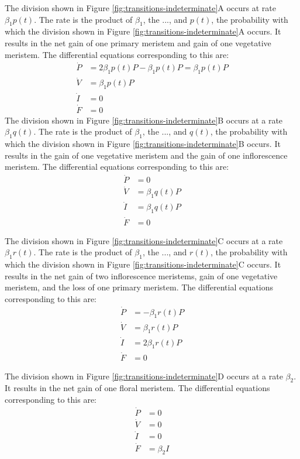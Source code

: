 \documentclass[12pt, oneside]{article}   	%
\begin{document}
The division shown in Figure \ref{fig:transitions-indeterminate}A occurs at rate $\beta_1 p(t)$. The rate is the product of $\beta_1$, the ..., and $p(t)$, the probability with which the division shown in Figure \ref{fig:transitions-indeterminate}A occurs. It results in the net gain of one primary meristem and gain of one vegetative meristem. The differential equations corresponding to this are:
%
\begin{align}
\dot{P} & = 2 \beta_1 p(t)  P - \beta_1 p(t) P = \beta_1 p(t) P \nonumber \\
\dot{V} & = \beta_1 p(t)  P      \nonumber \\
\dot{I} & = 0  \nonumber \\
\dot{F} & = 0
\end{align}
%
The division shown in Figure \ref{fig:transitions-indeterminate}B occurs at a rate $\beta_1 q(t)$. The rate is the product of $\beta_1$, the ..., and $q(t)$, the probability with which the division shown in Figure \ref{fig:transitions-indeterminate}B occurs. It results in the gain of one vegetative meristem and the gain of one inflorescence meristem. The differential equations corresponding to this are:
%
\begin{align}
\dot{P} & = 0 \nonumber \\
\dot{V} & = \beta_1 q(t) P      \nonumber \\
\dot{I} & =  \beta_1 q(t) P \nonumber \\
\dot{F} & = 0
\end{align}
%

The division shown in Figure \ref{fig:transitions-indeterminate}C occurs at a rate $\beta_1 r(t)$. The rate is the product of $\beta_1$, the ..., and $r(t)$, the probability with which the division shown in Figure \ref{fig:transitions-indeterminate}C occurs. It results in the net gain of two inflorescence meristems, gain of one vegetative meristem, and the loss of one primary meristem. The differential equations corresponding to this are:
%
\begin{align}
\dot{P} & = - \beta_1 r(t) P \nonumber \\
\dot{V} & = \beta_1 r(t)  P      \nonumber \\
\dot{I} & =  2 \beta_1 r(t) P \nonumber \\
\dot{F} & = 0
\end{align}
%

The division shown in Figure \ref{fig:transitions-indeterminate}D occurs at a rate $\beta_2 $. It results in the net gain of one floral meristem. The differential equations corresponding to this are:
%
\begin{align}
\dot{P} & = 0 \nonumber \\
\dot{V} & = 0      \nonumber \\
\dot{I} & =  0 \nonumber \\
\dot{F} & = \beta_2 I
\end{align}
%
\end{document}
